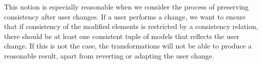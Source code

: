 
This notion is especially reasonable when we consider the process of preserving consistency after user changes.
If a user performs a change, we want to ensure that if consistency of the modified elements is restricted by a consistency relation, there should be at least one consistent tuple of models that reflects the user change.
If this is not the case, the transformations will not be able to produce a reasonable result, apart from reverting or adapting the user change.

